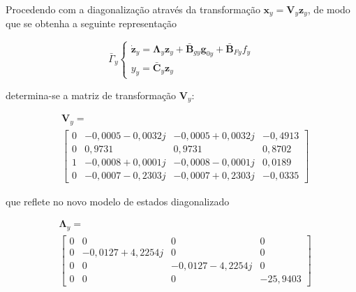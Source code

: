 \documentclass{ppgeesa}
\begin{document}
Procedendo com a diagonalização através da transformação $\mathbf{x}_y = \mathbf{V}_y \mathbf{z}_y$, de modo que se obtenha a seguinte representação

\begin{equation}
  \bar{\Gamma}_y
    \begin{cases}
      \dot{\mathbf{z}}_y = \mathbf{\Lambda}_y \mathbf{z}_y + \bar{\mathbf{B}}_{gy}\mathbf{g}_{0y} + \bar{\mathbf{B}}_{Fy} f_y\\
      y_y = \bar{\mathbf{C}}_y \mathbf{z}_y
  \end{cases}
\end{equation}


\noindent determina-se a matriz de transformação $\mathbf{V}_y$:

\begin{align}
&\mathbf{V}_y = \nonumber \\
&\begin{bmatrix}
    0 & -0{,}0005 - 0{,}0032j & -0{,}0005 + 0{,}0032j & -0{,}4913 \\
    0 & 0{,}9731 & 0{,}9731 & 0{,}8702 \\
    1 & -0{,}0008 + 0{,}0001j & -0{,}0008 - 0{,}0001j & 0{,}0189 \\
    0 & -0{,}0007 - 0{,}2303j & -0{,}0007 + 0{,}2303j & -0{,}0335
\end{bmatrix}
\end{align}

\noindent que reflete no novo modelo de estados diagonalizado

\begin{align}
&\mathbf{\Lambda}_y = \nonumber \\
&\begin{bmatrix}
    0 & 0 & 0 & 0 \\
    0 & -0{,}0127 + 4{,}2254j & 0 & 0 \\
    0 & 0 & -0{,}0127 - 4{,}2254j & 0 \\
    0 & 0 & 0 & -25{,}9403
\end{bmatrix}
\end{align}
\end{document}
